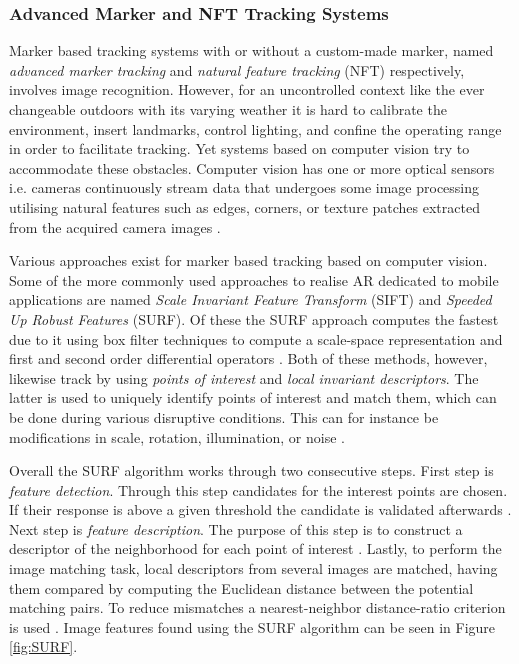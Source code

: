 \subsubsection{Advanced Marker and NFT Tracking Systems}
Marker based tracking systems with or without a custom-made marker, named \textit{advanced marker tracking} and \textit{natural feature tracking} (NFT) respectively, involves image recognition. However, for an uncontrolled context like the ever changeable outdoors with its varying weather it is hard to calibrate the environment, insert landmarks, control lighting, and confine the operating range in order to facilitate tracking. Yet systems based on computer vision try to accommodate these obstacles. Computer vision has one or more optical sensors i.e. cameras continuously stream data that undergoes some image processing utilising natural features such as edges, corners, or texture patches extracted from the acquired camera images \cite{Barandiaran2010} \cite{Maidi2011}. 

Various approaches exist for marker based tracking based on computer vision. Some of the more commonly used approaches to realise AR dedicated to mobile applications are named \textit{Scale Invariant Feature Transform} (SIFT) and \textit{Speeded Up Robust Features} (SURF). Of these the SURF approach computes the fastest due to it using box filter techniques to compute a scale-space representation and first and second order differential operators \cite{Oyallon2015}. Both of these methods, however, likewise track by using \textit{points of interest} and \textit{local invariant descriptors}. The latter is used to uniquely identify points of interest and match them, which can be done during various disruptive conditions. This can for instance be modifications in scale, rotation, illumination, or noise \cite{Maidi2011}.

Overall  the SURF algorithm works through two consecutive steps. First step is \textit{feature detection}. Through this step candidates for the interest points are chosen. If their response is above a given threshold the candidate is validated afterwards \cite{Oyallon2015}. Next step is \textit{feature description}. The purpose of this step is to construct a descriptor of the neighborhood for each point of interest \cite{Oyallon2015}. Lastly, to perform the image matching task, local descriptors from several images are matched, having them compared by computing the Euclidean distance between the potential matching pairs. To reduce mismatches a nearest-neighbor distance-ratio criterion is used \cite{Oyallon2015}. Image features found using the SURF algorithm can be seen in Figure \ref{fig:SURF}.


